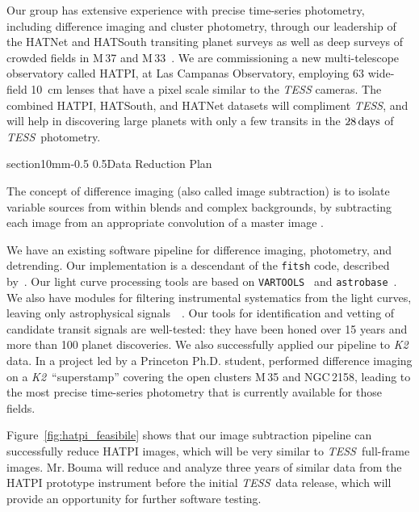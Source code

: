 \documentclass[letterpaper,11pt]{article}
\makeatletter
\renewcommand\section{\@startsection%
{section}{1}{0mm}{-0.5\baselineskip}%
{0.5\baselineskip}{\normalfont\normalsize\bfseries}}%
\newcommand{\tess}{{\it TESS}}
\newcommand{\ktwo}{{\it K2}}
\makeatother
\begin{document}
Our group has extensive experience with precise time-series
photometry, including difference imaging and cluster photometry,
through our leadership of the HATNet and HATSouth transiting planet
surveys as well as deep surveys of crowded fields in M\,37 and 
M\,33~\citep{hartman_deep_2006,hartman_deep_2009}.  We are commissioning a new
multi-telescope observatory called HATPI, at Las Campanas Observatory,
employing 63 wide-field 10~cm lenses that have a pixel scale similar
to the {\it TESS} cameras. 
The combined HATPI, HATSouth, and HATNet datasets will compliment
\tess, and will help in discovering large planets with only a few transits in 
the $28\,{\rm days}$ of \tess\ photometry.

\vspace{-0.3mm}
\section{Data Reduction Plan}
\vspace{-0.3mm}

The concept of difference imaging (also called image subtraction) is
to isolate variable sources from within blends and complex
backgrounds, by subtracting each image from an appropriate convolution
of a master image \citep{Alard_Lupton_1998}. 

We have an existing software pipeline for difference imaging, photometry, and 
detrending. Our implementation is a descendant of the \texttt{fitsh} code, 
described by~\citet{Pal_2012}. Our light curve processing tools are based on
\texttt{VARTOOLS}~\citep{Hartman_Bakos_2016} and 
\texttt{astrobase}~\citep{bhatti_astrobase_2018}.
We also have modules for filtering instrumental systematics from 
the light curves, leaving only astrophysical 
signals~~\citep{Kovacs_et_al_2005,Bakos_et_al_2010}.
Our tools for identification and vetting of candidate transit signals are 
well-tested: they have been honed over 15 years and more than 100 planet 
discoveries.
We also successfully applied our pipeline to {\it K2} data.
In a project led by a Princeton Ph.D. student,
\citet{Soares-Furtado_et_al_2017} performed difference imaging on a
\ktwo\ ``superstamp'' covering the open clusters M\,35 and NGC\,2158,
leading to the most precise time-series photometry that is currently
available for those fields.

Figure~\ref{fig:hatpi_feasibile} shows that our image subtraction
pipeline can successfully reduce HATPI images, which will be very
similar to \tess\ full-frame images.  
Mr.$\ $Bouma will reduce and analyze three years of 
similar data from the HATPI prototype instrument before the initial \tess\ 
data release, which will provide an opportunity for further software testing.
\end{document}

